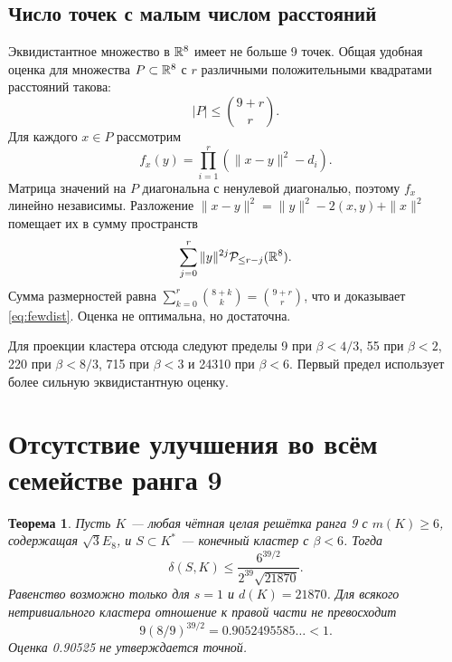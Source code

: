 \documentclass[11pt,a4paper]{article}
\newtheorem{theorem}{Теорема}[section]
\theoremstyle{remark}\newtheorem{remark}[theorem]{Замечание}
\begin{document}
\subsection{Число точек с малым числом расстояний}

Эквидистантное множество в $\mathbb R^8$ имеет не больше 9 точек. Общая удобная оценка для множества $P\subset\mathbb R^8$ с $r$ различными положительными квадратами расстояний такова:
\begin{equation}\label{eq:fewdist}
|P|\le\binom{9+r}{r}.
\end{equation}
Для каждого $x\in P$ рассмотрим
\[
f_x(y)=\prod_{i=1}^r(\|x-y\|^2-d_i).
\]
Матрица значений на $P$ диагональна с ненулевой диагональю, поэтому $f_x$ линейно независимы. Разложение $\|x-y\|^2=\|y\|^2-2(x,y)+\|x\|^2$ помещает их в сумму пространств
\[
\sum_{j=0}^r\|y\|^{2j}\mathcal P_{\le r-j}(\mathbb R^8).
\]
Сумма размерностей равна $\sum_{k=0}^r\binom{8+k}{k}=\binom{9+r}{r}$, что и доказывает \eqref{eq:fewdist}. Оценка не оптимальна, но достаточна.

Для проекции кластера отсюда следуют пределы 9 при $\beta<4/3$, 55 при $\beta<2$, 220 при $\beta<8/3$, 715 при $\beta<3$ и 24310 при $\beta<6$. Первый предел использует более сильную эквидистантную оценку.

\section{Отсутствие улучшения во всём семействе ранга 9}

\begin{theorem}\label{thm:cluster9}
Пусть $K$ --- любая чётная целая решётка ранга 9 с $m(K)\ge6$, содержащая $\sqrt3E_8$, и $S\subset K^*$ --- конечный кластер с $\beta<6$. Тогда
\[
\delta(S,K)\le\frac{6^{39/2}}{2^{39}\sqrt{21870}}.
\]
Равенство возможно только для $s=1$ и $d(K)=21870$. Для всякого нетривиального кластера отношение к правой части не превосходит
\[
9(8/9)^{39/2}=0.9052495585\ldots<1.
\]
Оценка 0.90525 не утверждается точной.
\end{theorem}
\end{document}

